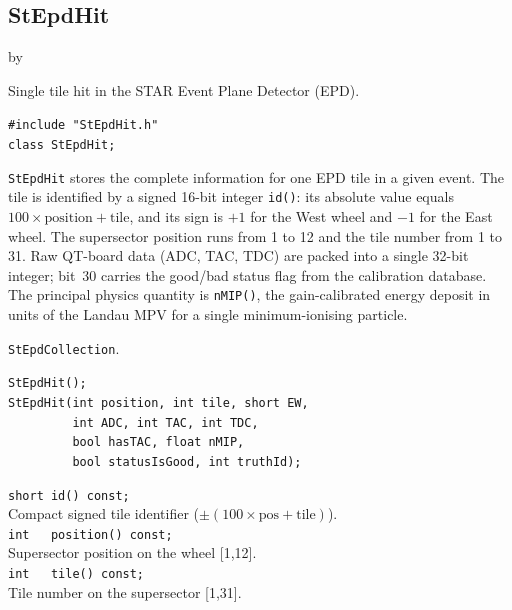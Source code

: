 \documentclass[twoside]{article}
\newcommand{\entrylabel}[1]{\mbox{\textbf{{#1}}}\hfil}%
\newenvironment{entry}
{\begin{list}{}%
    {\renewcommand{\makelabel}{\entrylabel}%
     \setlength{\labelwidth}{90pt}%
     \setlength{\leftmargin}{\labelwidth}
     \advance\leftmargin by \labelsep%
      }%
    }%
  {\end{list}}
\newcommand{\Entrylabel}[1]%
{\raisebox{0pt}[1ex][0pt]{\makebox[\labelwidth][l]%
    {\parbox[t]{\labelwidth}{\hspace{0pt}\textbf{{#1}}}}}}
\newenvironment{Entry}%
{\renewcommand{\entrylabel}{\Entrylabel}\begin{entry}}%
  {\end{entry}}
\begin{document}
\subsection{StEpdHit}
\label{sec:StEpdHit}
\begin{Entry}
\item[Summary] Single tile hit in the STAR Event Plane Detector (EPD).
\item[Synopsis]
    \verb+#include "StEpdHit.h"+\\
    \verb+class StEpdHit;+\\
\item[Description]
    \texttt{StEpdHit} stores the complete information for one EPD tile in a
    given event.  The tile is identified by a signed 16-bit integer
    \verb+id()+: its absolute value equals $100\times\text{position}+\text{tile}$,
    and its sign is $+1$ for the West wheel and $-1$ for the East wheel.
    The supersector position runs from 1 to 12 and the tile number from 1 to
    31.  Raw QT-board data (ADC, TAC, TDC) are packed into a single 32-bit
    integer; bit~30 carries the good/bad status flag from the calibration
    database.  The principal physics quantity is \verb+nMIP()+, the
    gain-calibrated energy deposit in units of the Landau MPV for a single
    minimum-ionising particle.
\item[Related Classes]
    \texttt{StEpdCollection}.
\item[Public\\ Constructors]
    \verb+StEpdHit();+\\
    \verb+StEpdHit(int position, int tile, short EW,+\\
    \verb+         int ADC, int TAC, int TDC,+\\
    \verb+         bool hasTAC, float nMIP,+\\
    \verb+         bool statusIsGood, int truthId);+\\
\item[Public Member\\ Functions]
    \verb+short id() const;+\\
    Compact signed tile identifier ($\pm(100\times\text{pos}+\text{tile})$).\\
    \verb+int   position() const;+\\
    Supersector position on the wheel [1,12].\\
    \verb+int   tile() const;+\\
    Tile number on the supersector [1,31].\\

\end{Entry}
\end{document}
